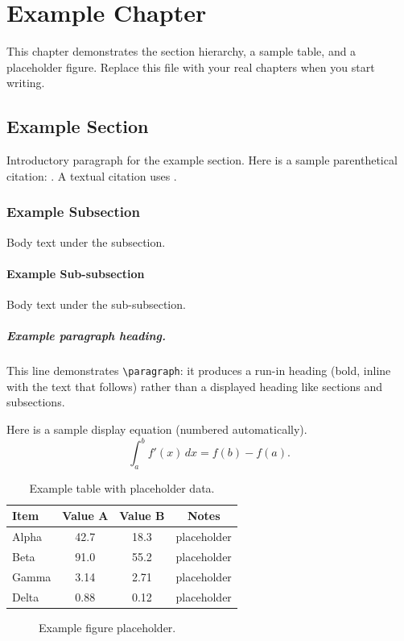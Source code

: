 \chapter{Example Chapter}

This chapter demonstrates the section hierarchy, a sample table, and a placeholder
figure. Replace this file with your real chapters when you start writing.

\section{Example Section}

Introductory paragraph for the example section. Here is a sample parenthetical
citation: \citep{knuth1984literate}. A textual citation uses
\citet{knuth1984literate}.

\subsection{Example Subsection}

Body text under the subsection.

\subsubsection{Example Sub-subsection}
 
Body text under the sub-subsection.

\paragraph{Example paragraph heading.}
This line demonstrates \verb|\paragraph|: it produces a run-in heading (bold,
inline with the text that follows) rather than a displayed heading like sections
and subsections.

Here is a sample display equation (numbered automatically).
\begin{equation}
  \label{eq:example}
  \int_{a}^{b} f'(x)\,dx = f(b) - f(a).
\end{equation}

\begin{table}[ht]
  \centering
  \begin{tabular}{lccc}
    \toprule
    Item & Value A & Value B & Notes \\
    \midrule
    Alpha & 42.7 & 18.3 & placeholder \\
    Beta & 91.0 & 55.2 & placeholder \\
    Gamma & 3.14 & 2.71 & placeholder \\
    Delta & 0.88 & 0.12 & placeholder \\
    \bottomrule
  \end{tabular}
  \caption{Example table with placeholder data.}
  \label{tab:example-placeholder}
\end{table}

\begin{figure}[ht]
  \centering
  \caption{Example figure placeholder.}
  \label{fig:example-placeholder}
\end{figure}
